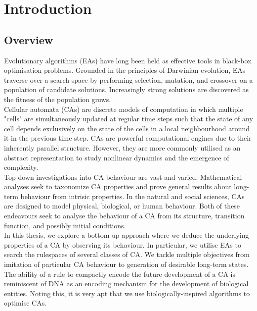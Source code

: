 \chapter{Introduction}

\section{Overview}

Evolutionary algorithms (EAs) have long been held as effective tools in black-box optimisation problems. Grounded in the principles of Darwinian evolution, EAs traverse over a search space by performing selection, mutation, and crossover on a population of candidate solutions. Increasingly strong solutions are discovered as the fitness of the population grows.\\

Cellular automata (CAs) are discrete models of computation in which multiple "cells" are simultaneously updated at regular time steps such that the state of any cell depends exclusively on the state of the cells in a local neighbourhood around it in the previous time step. CAs are powerful computational engines due to their inherently parallel structure. However, they are more commonly utilised as an abstract representation to study nonlinear dynamics and the emergence of complexity.\\

Top-down investigations into CA behaviour are vast and varied. Mathematical analyses seek to taxonomize CA properties and prove general results about long-term behaviour from intrisic properties. In the natural and social sciences, CAs are designed to model physical, biological, or human behaviour. Both of these endeavours seek to analyse the behaviour of a CA from its structure, transition function, and possibly initial conditions.\\

In this thesis, we explore a bottom-up approach where we deduce the underlying properties of a CA by observing its behaviour. In particular, we utilise EAs to search the rulespaces of several classes of CA. We tackle multiple objectives from imitation of particular CA behaviour to generation of desirable long-term states. The ability of a rule to compactly encode the future development of a CA is reminiscent of DNA as an encoding mechanism for the development of biological entities. Noting this, it is very apt that we use biologically-inspired algorithms to optimise CAs.\\

